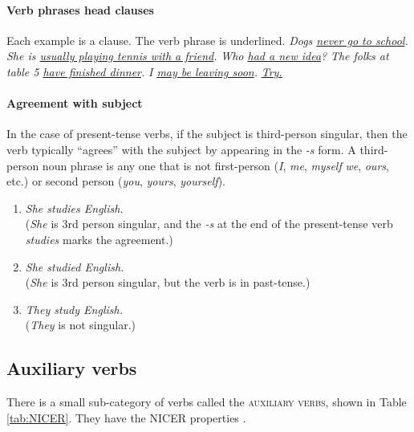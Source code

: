 \paragraph*{Verb phrases head clauses}\label{sec:VPs_head_clauses}
Each example is a clause. The verb phrase is underlined. \textit{Dogs \uline{never go to school}.}  \textit{She is \uline{usually playing tennis with a friend}.} \textit{Who \uline{had a new idea}?} \textit{The folks at table 5 \uline{have finished dinner}.} \textit{I \uline{may be leaving soon}.} \textit{\uline{Try.}} 

\paragraph*{Agreement with subject}\label{sec:agreement}
In the case of present-tense verbs, if the subject is third-person singular, then the verb typically ``agrees'' with the subject by appearing in the \textit{-s} form. A third-person noun phrase is any one that is not first-person (\textit{I}, \textit{me}, \textit{myself} \textit{we}, \textit{ours}, etc.) or second person (\textit{you}, \textit{yours}, \textit{yourself}).

\begin{enumerate}[noitemsep]
    \item     \noindent\textit{She studies English.} \\(\textit{She} is 3rd person singular, and the \textit{-s} at the end of the present-tense verb \textit{studies} marks the agreement.)
    \item \textit{She studied English.} \\(\textit{She} is 3rd person singular, but the verb is in past-tense.)
    \item \textit{They study English.} \\(\textit{They} is not singular.)
\end{enumerate}

\subsection{Auxiliary verbs}\label{sec:aux}

There is a small sub-category of verbs called the \textsc{auxiliary verbs}, shown in Table \ref{tab:NICER}. They have the \textsc{NICER} properties \citep{sag2019}.

